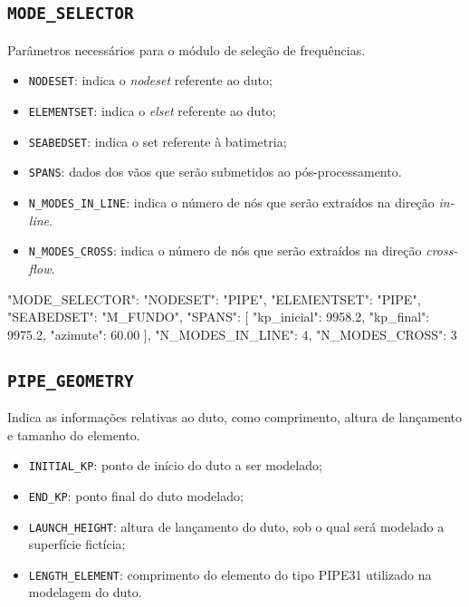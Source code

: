 \subsection{\texttt{MODE\_SELECTOR}}

Parâmetros necessários para o módulo de seleção de frequências.

\begin{itemize}
  \item \texttt{NODESET}: indica o \textit{nodeset} referente ao duto;
  \item \texttt{ELEMENTSET}: indica o \textit{elset} referente ao duto;
  \item \texttt{SEABEDSET}: indica o set referente à batimetria;
  \item \texttt{SPANS}: dados dos vãos que serão submetidos ao pós-processamento.
  \item \texttt{N\_MODES\_IN\_LINE}: indica o número de nós que serão extraídos na direção \textit{in-line}.
  \item \texttt{N\_MODES\_CROSS}: indica o número de nós que serão extraídos na direção \textit{cross-flow}.
\end{itemize}

\begin{jsoncode}
{
  "MODE_SELECTOR": {
    "NODESET": "PIPE",
    "ELEMENTSET": "PIPE",
    "SEABEDSET": "M_FUNDO",
    "SPANS": [
        {
          "kp_inicial": 9958.2,
          "kp_final": 9975.2,
          "azimute": 60.00
        }
      ],
    "N_MODES_IN_LINE": 4,
    "N_MODES_CROSS": 3
  }
}
\end{jsoncode}

\subsection{\texttt{PIPE\_GEOMETRY}}

Indica as informações relativas ao duto, como comprimento, altura de lançamento e tamanho do elemento.

\begin{itemize}
  \item \texttt{INITIAL\_KP}: ponto de início do duto a ser modelado;
  \item \texttt{END\_KP}: ponto final do duto modelado;
  \item \texttt{LAUNCH\_HEIGHT}: altura de lançamento do duto, sob o qual será modelado a superfície fictícia;
  \item \texttt{LENGTH\_ELEMENT}: comprimento do elemento do tipo PIPE31 utilizado na modelagem do duto.
\end{itemize}

